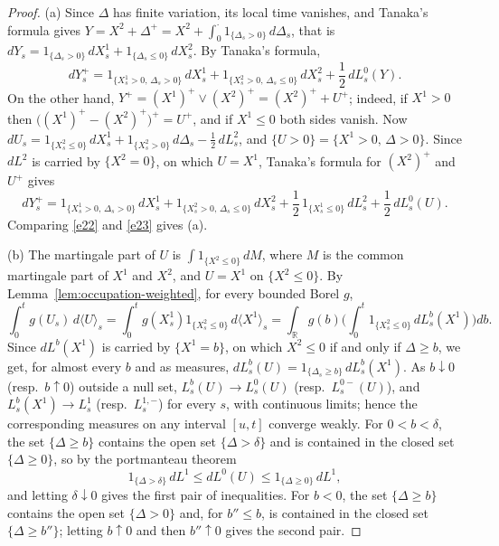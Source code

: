 \begin{proof}
	(a) Since $\Delta$ has finite variation, its local time vanishes, and
	Tanaka's formula gives $Y = X^2 + \Delta^+ = X^2 + \int_0^\cdot 1_{\{\Delta_s > 0\}}\,d\Delta_s$,
	that is $dY_s = 1_{\{\Delta_s > 0\}}\,dX^1_s + 1_{\{\Delta_s\leqslant 0\}}\,dX^2_s$.
	By Tanaka's formula,
	\begin{equation}\label{e22}
		dY^+_s = 1_{\{X^1_s>0,\, \Delta_s > 0\}}\,dX^1_s + 1_{\{X^2_s>0,\, \Delta_s\leqslant 0\}}\,dX^2_s
		+ \frac{1}{2}\,dL^0_s(Y).
	\end{equation}
	On the other hand, $Y^+ = (X^1)^+\vee(X^2)^+ = (X^2)^+ + U^+$; indeed, if
	$X^1 > 0$ then $\big((X^1)^+ - (X^2)^+\big)^+ = U^+$, and if $X^1\leqslant 0$ both
	sides vanish. Now $dU_s = 1_{\{X^2_s\leqslant 0\}}\,dX^1_s + 1_{\{X^2_s>0\}}\,d\Delta_s - \frac{1}{2}\,dL^2_s$,
	and $\{U>0\} = \{X^1 > 0,\, \Delta > 0\}$. Since $dL^2$ is carried by
	$\{X^2 = 0\}$, on which $U = X^1$, Tanaka's formula for $(X^2)^+$ and $U^+$ gives
	\begin{equation}\label{e23}
		dY^+_s = 1_{\{X^1_s>0,\, \Delta_s > 0\}}\,dX^1_s + 1_{\{X^2_s>0,\, \Delta_s\leqslant 0\}}\,dX^2_s
		+ \frac{1}{2}\,1_{\{X^1_s\leqslant 0\}}\,dL^2_s + \frac{1}{2}\,dL^0_s(U).
	\end{equation}
	Comparing \eqref{e22} and \eqref{e23} gives (a).

	(b) The martingale part of $U$ is $\int 1_{\{X^2\leqslant 0\}}\,dM$, where $M$ is the
	common martingale part of $X^1$ and $X^2$, and $U = X^1$ on $\{X^2\leqslant 0\}$.
	By Lemma~\ref{lem:occupation-weighted}, for every bounded Borel $g$,
	\[
		\int_0^t g(U_s)\,d\langle U\rangle_s = \int_0^t g(X^1_s)1_{\{X^2_s\leqslant 0\}}\,d\langle X^1\rangle_s
		= \int_\mathbb{R} g(b)\Big(\int_0^t 1_{\{X^2_s\leqslant 0\}}\,dL^b_s(X^1)\Big)db .
	\]
	Since $dL^b(X^1)$ is carried by $\{X^1 = b\}$, on which $X^2\leqslant 0$ if and
	only if $\Delta \geqslant b$, we get, for almost every $b$ and as measures,
	$dL^b_s(U) = 1_{\{\Delta_s \geqslant b\}}\,dL^b_s(X^1)$. As $b\downarrow 0$ (resp.\
	$b\uparrow 0$) outside a null set, $L^b_s(U)\to L^0_s(U)$ (resp.\ $L^{0-}_s(U)$),
	and $L^b_s(X^1)\to L^1_s$ (resp.\ $L^{1,-}_s$) for every $s$, with continuous
	limits; hence the corresponding measures on any interval $[u,t]$ converge
	weakly. For $0<b<\delta$, the set $\{\Delta \geqslant b\}$ contains the open set
	$\{\Delta > \delta\}$ and is contained in the closed set $\{\Delta\geqslant 0\}$, so by
	the portmanteau theorem
	\[
		1_{\{\Delta>\delta\}}\,dL^1 \leqslant dL^0(U) \leqslant 1_{\{\Delta\geqslant 0\}}\,dL^1,
	\]
	and letting $\delta\downarrow 0$ gives the first pair of inequalities. For $b<0$, the
	set $\{\Delta\geqslant b\}$ contains the open set $\{\Delta > 0\}$ and, for
	$b'' \leqslant b$, is contained in the closed set $\{\Delta\geqslant b''\}$; letting
	$b\uparrow 0$ and then $b''\uparrow 0$ gives the second pair.


\end{proof}
